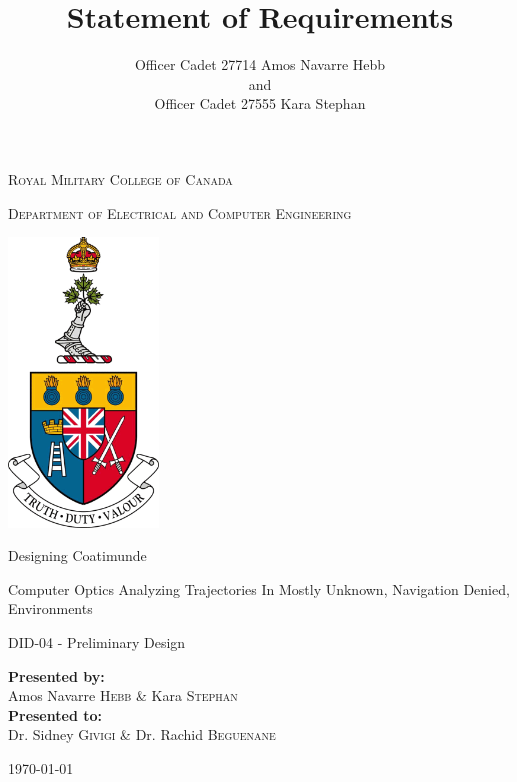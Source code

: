 \documentclass{article}
\title{Statement of Requirements}
\author{Officer Cadet 27714 Amos Navarre Hebb\\and\\Officer Cadet 27555 Kara Stephan}
\begin{document}
	
\begin{titlepage}
	\begin{center}
		\vspace*{1cm}
		
		\LARGE\textsc{Royal Military College of Canada}\normalsize
		
		\vspace{0.2cm}
		
		\textsc{Department of Electrical and Computer Engineering}
		
		\vspace{1.5cm}
		
		\includegraphics[width=0.3\textwidth]{rmcLogo.png}
		
		\vspace{1.5cm}
		
		\LARGE{Designing Coatimunde \\}
		
		\vspace{0.2cm}
		
		\normalsize{Computer Optics Analyzing Trajectories In Mostly Unknown, Navigation Denied, Environments}
		
		\vspace{0.1cm}
		
		\normalsize{DID-04 - Preliminary Design}
		
		\vfill
		
		\textbf{Presented by:}\\Amos Navarre \textsc{Hebb} \& Kara \textsc{Stephan}\\
		\vspace{0.8cm}
		\textbf{Presented to:}\\Dr. Sidney \textsc{Givigi} \& Dr. Rachid \textsc{Beguenane}
		\vspace{0.8cm}
		
		\today
		
	\end{center}
\end{titlepage}
\end{document}
